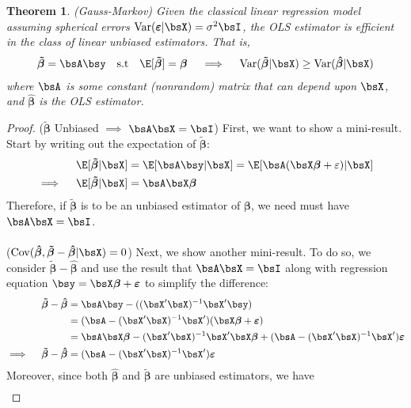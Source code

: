 \documentclass[12pt]{article}
\theoremstyle{plain}
\newtheorem{thm}{Theorem}[section]
\theoremstyle{definition}
\theoremstyle{remark}
\newcommand{\bsvarepsilon}{\boldsymbol{\varepsilon}}
\newcommand{\bsbeta}{\boldsymbol{\beta}}
\newcommand{\bshatbeta}{\boldsymbol{\hat{\beta}}}
\newcommand{\bstildebeta}{\boldsymbol{\tilde{\beta}}}
\newcommand{\Cov}{\operatorname{Cov}}
\newcommand{\Var}{\operatorname{Var}}
\begin{document}
\begin{thm}\emph{(Gauss-Markov)}
Given the classical linear regression model assuming spherical errors
$\Var(\bsvarepsilon|\bsX)=\sigma^2\bsI$, the OLS estimator is
\emph{efficient} in the class of linear unbiased estimators. That is,
\begin{align*}
  \bstildebeta = \bsA\bsy
  \quad \text{s.t}\quad \E[\bstildebeta]=\bsbeta
  \quad\implies\quad
  \Var(\bstildebeta|\bsX) \geq \Var(\bshatbeta|\bsX)
\end{align*}
where $\bsA$ is some constant (nonrandom) matrix that can depend upon
$\bsX$, and $\bshatbeta$ is the OLS estimator.
\end{thm}
\begin{proof}
($\bstildebeta$ Unbiased $\implies$ $\bsA\bsX=\bsI$)
First, we want to show a mini-result. Start by writing out the
expectation of $\bstildebeta$:
\begin{align*}
  \E[\bstildebeta|\bsX]
  &= \E[\bsA\bsy|\bsX]
  = \E[\bsA(\bsX\bsbeta +\varepsilon)|\bsX] \\
  \implies\quad
  \E[\bstildebeta|\bsX]
  &= \bsA\bsX\bsbeta
\end{align*}
Therefore, if $\bstildebeta$ is to be an unbiased estimator of
$\bsbeta$, we need must have $\bsA\bsX=\bsI$.
\\
\\
($\Cov(\bshatbeta, \bstildebeta-\bshatbeta|\bsX)=0$)
Next, we show another mini-result. To do so, we consider
$\bstildebeta-\bshatbeta$ and use the result that $\bsA\bsX=\bsI$ along
with regression equation $\bsy=\bsX\bsbeta+\bsvarepsilon$ to simplify
the difference:
\begin{align}
  \bstildebeta - \bshatbeta
  &= \bsA\bsy - ((\bsX'\bsX)^{-1}\bsX'\bsy) \notag\\
  &= (\bsA-(\bsX'\bsX)^{-1}\bsX')(\bsX\bsbeta + \bsvarepsilon) \notag\\
  &= \bsA\bsX\bsbeta-(\bsX'\bsX)^{-1}\bsX'\bsX\bsbeta
    + (\bsA-(\bsX'\bsX)^{-1}\bsX')\bsvarepsilon \notag \\
  \implies\quad
  \bstildebeta - \bshatbeta
  &= (\bsA-(\bsX'\bsX)^{-1}\bsX')\bsvarepsilon
  \label{betatilde-betahat}
\end{align}
Moreover, since both $\bshatbeta$ and $\bstildebeta$ are unbiased
estimators, we have
\begin{align*}

\end{align*}
\end{proof}
\end{document}
